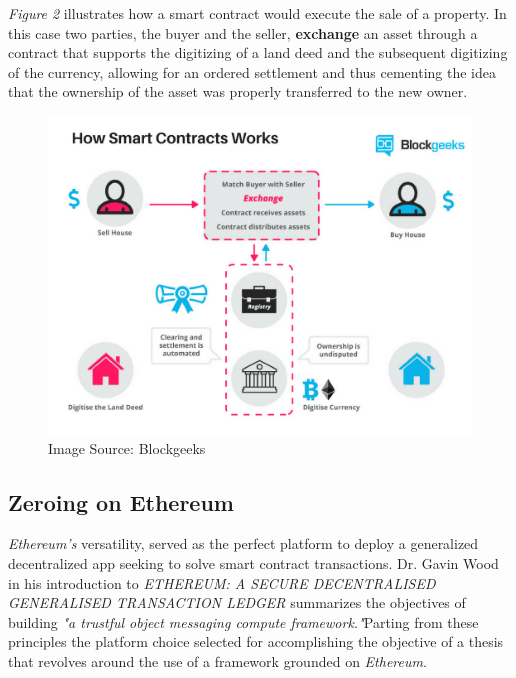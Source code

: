 \documentclass[submission,copyright,creativecommons]{eptcs}
\begin{document}
\textit{Figure 2} illustrates how a smart contract would execute the sale of a property.  In this case two parties, the buyer and the seller, \textbf{exchange} an asset through a contract that supports the digitizing of a land deed and the subsequent digitizing of the currency, allowing for an ordered settlement and thus cementing the idea that the ownership of the asset was properly transferred to the new owner\cite{WhatAreSmart}.
\begin{figure}[h]
    \centering
    \label{fig:howsmartcontractsworks}
    \includegraphics[width=5in]{How-Smart-Contracts-Works-1.png}
     \caption{Image Source: Blockgeeks}
\end{figure}

\subsection{Zeroing on Ethereum}
\textit{Ethereum's} versatility, served as the perfect platform to deploy a generalized decentralized app seeking to solve smart contract transactions.  Dr. Gavin Wood in his introduction to \textit{ETHEREUM: A SECURE DECENTRALISED GENERALISED TRANSACTION LEDGER} summarizes the objectives of building \textit{"a trustful object messaging compute framework."}\cite{wood2014ethereum}Parting from these principles the platform choice selected for accomplishing the objective of a thesis that revolves around the use of a framework grounded on \textit{Ethereum}. 
\end{document}
